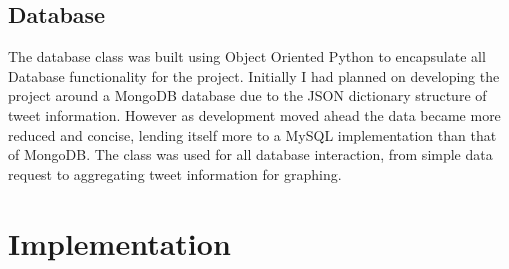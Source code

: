 \documentclass[12pt,a4paper]{report}
\begin{document}
  \section{Database}
  The database class was built using Object Oriented Python to encapsulate all Database functionality for the project. Initially I had planned on developing the project around a MongoDB\cite{MongoDB} database due to the JSON dictionary structure of tweet information. However as development moved ahead the data became more reduced and concise, lending itself more to a MySQL\cite{MySQL} implementation than that of MongoDB. The class was used for all database interaction, from simple data request to aggregating tweet information for graphing.

\clearpage
\chapter{Implementation}
\end{document}
